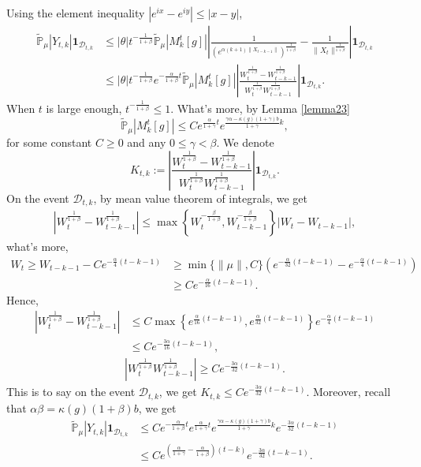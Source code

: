 \documentclass[12pt, a4paper]{amsart}
\theoremstyle{definition}
\numberwithin{equation}{section}
\begin{document}
    Using the element inequality $|e^{ix}-e^{iy}|\leq|x-y|$,
    \begin{align*}
        \mathbb{\tilde{P}}_{\mu}|Y_{t,k}|\mathbf{1}_{\mathcal{D}_{t,k}}&\leq|\theta|t^{-\frac{1}{1+\beta}}\mathbb{\tilde{P}}_{\mu}|M_k^t[g]|\left|\frac{1}{\left(e^{\alpha(k+1)\|X_{t-k-1}\|}\right)^{\frac{1}{1+\beta}}}-\frac{1}{\|X_t\|^{\frac{1}{1+\beta}}}\right|\mathbf{1}_{\mathcal{D}_{t,k}}\\
        &\leq|\theta|t^{-\frac{1}{1+\beta}}e^{-\frac{\alpha}{1+\beta}t}\mathbb{\tilde{P}}_{\mu}|M_k^t[g]|\left|\frac{W_t^{\frac{1}{1+\beta}}-W_{t-k-1}^{\frac{1}{1+\beta}}}{W_t^{\frac{1}{1+\beta}}W_{t-k-1}^{\frac{1}{1+\beta}}}\right|\mathbf{1}_{\mathcal{D}_{t,k}}.
    \end{align*}
    When $t$ is large enough, $t^{-\frac{1}{1+\beta}}\leq 1$. What's more, by Lemma \ref{lemma23}
    $$\mathbb{\tilde{P}}_{\mu}|M_k^t[g]|\leq C e^{\frac{\alpha}{1+\gamma}t}e^{\frac{\gamma \alpha-\kappa(g)(1+\gamma)b}{1+\gamma}k},$$
for some constant $C \geq 0$ and any $0\leq\gamma<\beta$.
We denote
$$K_{t,k}:=\left|\frac{W_t^{\frac{1}{1+\beta}}-W_{t-k-1}^{\frac{1}{1+\beta}}}{W_t^{\frac{1}{1+\beta}}W_{t-k-1}^{\frac{1}{1+\beta}}}\right|\mathbf{1}_{\mathcal{D}_{t,k}}.$$
 On the event $\mathcal{D}_{t,k}$, by mean value theorem of integrals, we get
 \begin{align*}
     \left|W_t^{\frac{1}{1+\beta}}-W_{t-k-1}^{\frac{1}{1+\beta}}\right|\leq \max \left\{W_t^{-\frac{\beta}{1+\beta}},W_{t-k-1}^{-\frac{\beta}{1+\beta}}\right\}\left|W_t-W_{t-k-1}\right|,
 \end{align*}
 what's more, 
 \begin{align*}
     W_t\geq W_{t-k-1}-C e^{-\frac{\alpha}{4}(t-k-1)}&\geq\min\{\|\mu\|,C\}\left(e^{-\frac{\alpha}{32}(t-k-1)}-e^{-\frac{\alpha}{4}(t-k-1)}\right)\\
     &\geq C e^{-\frac{\alpha}{16}(t-k-1)}.
 \end{align*}
Hence, 
\begin{align*}
    \left|W_t^{\frac{1}{1+\beta}}-W_{t-k-1}^{\frac{1}{1+\beta}}\right|&\leq C \max\left\{e^{\frac{\alpha}{16}(t-k-1)}, e^{\frac{\alpha}{32}(t-k-1)}\right\}e^{-\frac{\alpha}{4}(t-k-1)}\\
    &\leq C e^{-\frac{3\alpha}{16}(t-k-1)},
\end{align*}
\begin{align*}
    \left|W_t^{\frac{1}{1+\beta}}W_{t-k-1}^{\frac{1}{1+\beta}}\right|\geq C e^{-\frac{3\alpha}{32}(t-k-1)}.
\end{align*}
This is to say on the event $\mathcal{D}_{t,k}$, we get $K_{t,k}\leq C e^{-\frac{3\alpha}{32}(t-k-1)}$. Moreover, recall that $\alpha\beta=\kappa(g)(1+\beta)b$, we get
\begin{align}
    \mathbb{\tilde{P}}_{\mu}|Y_{t,k}|\mathbf{1}_{\mathcal{D}_{t,k}}&\leq C e^{-\frac{\alpha}{1+\beta}t}e^{\frac{\alpha}{1+\gamma}t}e^{\frac{\gamma \alpha-\kappa(g)(1+\gamma)b}{1+\gamma}k}e^{-\frac{3\alpha}{32}(t-k-1)}\label{thm125}\\
    &\leq C e^{(\frac{\alpha}{1+\gamma}-\frac{\alpha}{1+\beta})(t-k)}e^{-\frac{3\alpha}{32}(t-k-1)}.\nonumber
\end{align}
\end{document}
